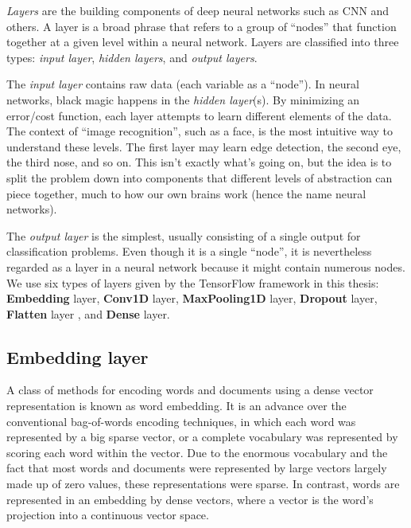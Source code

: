 \newpage
\emph{Layers} are the building components of deep neural networks such as CNN and others. A layer is a broad phrase that refers to a group of ``nodes'' that function together at a given level within a neural network. Layers are classified into three types: \emph{input layer},\emph{ hidden layers}, and \emph{output layers}.

The \emph{input layer} contains raw data (each variable as a ``node'').
In neural networks, black magic happens in the \emph{hidden layer}(s). By minimizing an error/cost function, each layer attempts to learn different elements of the data. The context of ``image recognition'', such as a face, is the most intuitive way to understand these levels. The first layer may learn edge detection, the second eye, the third nose, and so on. This isn't exactly what's going on, but the idea is to split the problem down into components that different levels of abstraction can piece together, much to how our own brains work (hence the name neural networks).

The \emph{output layer} is the simplest, usually consisting of a single output for classification problems. Even though it is a single ``node'', it is nevertheless regarded as a layer in a neural network because it might contain numerous nodes. We use six types of layers given by the TensorFlow framework in this thesis: \textbf{Embedding} layer, \textbf{Conv1D} layer, \textbf{MaxPooling1D} layer, \textbf{Dropout} layer, \textbf{Flatten} layer , and \textbf{Dense} layer.

\subsection{Embedding layer}
\hspace{0.5cm}A class of methods for encoding words and documents using a dense vector representation is known as word embedding. It is an advance over the conventional bag-of-words encoding techniques, in which each word was represented by a big sparse vector, or a complete vocabulary was represented by scoring each word within the vector. Due to the enormous vocabulary and the fact that most words and documents were represented by large vectors largely made up of zero values, these representations were sparse. In contrast, words are represented in an embedding by dense vectors, where a vector is the word's projection into a continuous vector space.

